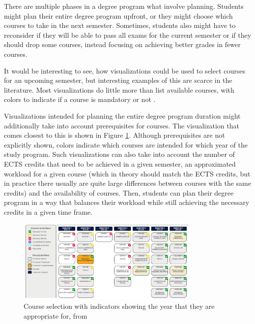 There are multiple phases in a degree program what involve planning. Students might plan their entire degree program upfront, or they might choose which courses to take in the next semester.
Sometimes, students also might have to reconsider if they will be able to pass all exams for the current semester or if they should drop some courses, instead focusing on achieving better grades in fewer courses.

It would be interesting to see, how visualizations could be used to select courses for an upcoming semester, but interesting examples of this are scarce in the literature. Most visualizations do little more than list available courses, with colors to indicate if a course is mandatory or not \cite{Dashboard-StudentProgress}.

Visualizations intended for planning the entire degree program duration might additionally take into account prerequisites for courses. The visualization that comes closest to this is shown in Figure \ref{fig:planning}. Although prerequisites are not explicitly shown, colors indicate which courses are intended for which year of the study program.
Such visualizations can also take into account the number of ECTS credits that need to be achieved in a given semester, an approximated workload for a given course (which in theory should match the ECTS credits, but in practice there usually are quite large differences between courses with the same credits) and the availability of courses. Then, students can plan their degree program in a way that balances their workload while still achieving the necessary credits in a given time frame.

\begin{figure}
    \centering
    \includegraphics[width=0.8\textwidth]{figures/planning.png}
    \caption{Course selection with indicators showing the year that they are appropriate for, from \cite{LISSA-Planning}}
    \label{fig:planning}
\end{figure}



